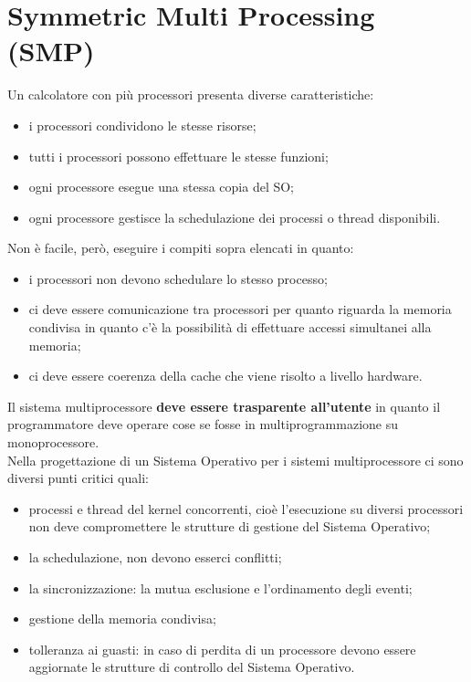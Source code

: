 \documentclass[12pt, letterpaper]{report}
\begin{document}
	\section{Symmetric Multi Processing (SMP)}
	Un calcolatore con più processori presenta diverse caratteristiche:
	\begin{itemize}
		\item i processori condividono le stesse risorse;
		\item tutti i processori possono effettuare le stesse funzioni;
		\item ogni processore esegue una stessa copia del SO;
		\item ogni processore gestisce la schedulazione dei processi o thread disponibili.
	\end{itemize}
	Non è facile, però, eseguire i compiti sopra elencati in quanto:
	\begin{itemize}
		\item i processori non devono schedulare lo stesso processo;
		\item ci deve essere comunicazione tra processori per quanto riguarda la memoria condivisa in quanto c'è la possibilità di effettuare accessi simultanei alla memoria;
		\item ci deve essere coerenza della cache che viene risolto a livello hardware.
	\end{itemize}
	Il sistema multiprocessore \textbf{deve essere trasparente all'utente} in quanto il programmatore deve operare cose se fosse in multiprogrammazione su monoprocessore. \\
	Nella progettazione di un Sistema Operativo per i sistemi multiprocessore ci sono diversi punti critici quali:
	\begin{itemize}
		\item processi e thread del kernel concorrenti, cioè l'esecuzione su diversi processori non deve compromettere le strutture di gestione del Sistema Operativo;
		\item la schedulazione, non devono esserci conflitti;
		\item la sincronizzazione: la mutua esclusione e l'ordinamento degli eventi;
		\item gestione della memoria condivisa;
		\item tolleranza ai guasti: in caso di perdita di un processore devono essere aggiornate le strutture di controllo del Sistema Operativo.
	\end{itemize}
\end{document}
